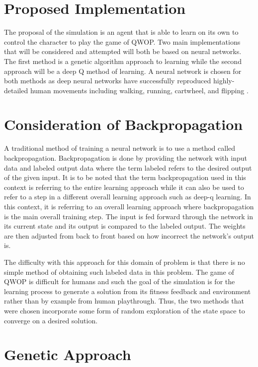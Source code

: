 \documentclass[letterpaper]{article} %
\begin{document}
\section{Proposed Implementation}

The proposal of the simulation is an agent that is able to learn on its own to control the character to play the game of QWOP. Two main implementations that will be considered and attempted will both be based on neural networks. The first method is a genetic algorithm approach to learning while the second approach will be a deep Q method of learning. A neural network is chosen for both methods as deep neural networks have successfully reproduced highly-detailed human movements including walking, running, cartwheel, and flipping \cite{2018-TOG-deepMimic}.

\section{Consideration of Backpropagation}

A traditional method of training a neural network is to use a method called backpropagation. Backpropagation is done by providing the network with input data and labeled output data where the term labeled refers to the desired output of the given input. It is to be noted that the term backpropagation used in this context is referring to the entire learning approach while it can also be used to refer to a step in a different overall learning approach such as deep-q learning. In this context, it is referring to an overall learning approach where backpropagation is the main overall training step. The input is fed forward through the network in its current state and its output is compared to the labeled output. The weights are then adjusted from back to front based on how incorrect the network's output is. 

\par The difficulty with this approach for this domain of problem is that there is no simple method of obtaining such labeled data in this problem. The game of QWOP is difficult for humans and such the goal of the simulation is for the learning process to generate a solution from its fitness feedback and environment rather than by example from human playthrough. Thus, the two methods that were chosen incorporate some form of random exploration of the state space to converge on a desired solution.

\section{Genetic Approach}
\end{document}

